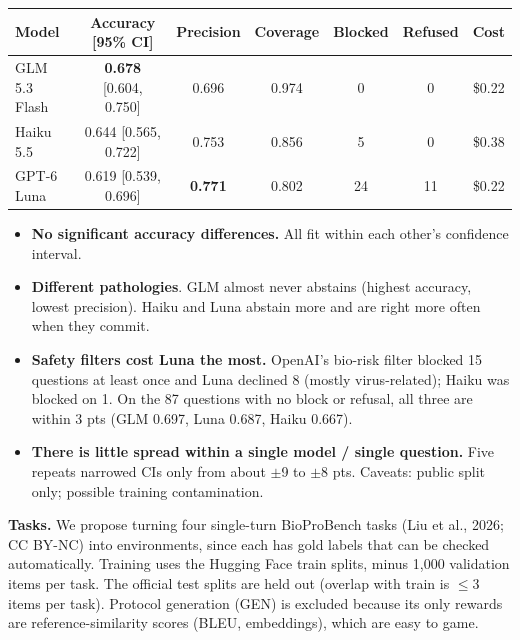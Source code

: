\documentclass[10pt]{article}
\newcommand{\sect}[1]{\par\vspace{5pt}{\bfseries #1}\par\vspace{1pt}}
\begin{document}
\sect{Eval results}
\vspace{-4pt}\begin{center}\small
\begin{tabular}{lcccccc}
\toprule
Model & Accuracy [95\% CI] & Precision & Coverage & Blocked & Refused & Cost \\
\midrule
GLM 5.3 Flash & \textbf{0.678} [0.604, 0.750] & 0.696 & 0.974 & 0 & 0 & \$0.22 \\
Haiku 5.5     & 0.644 [0.565, 0.722] & 0.753 & 0.856 & 5 & 0 & \$0.38 \\
GPT-6 Luna    & 0.619 [0.539, 0.696] & \textbf{0.771} & 0.802 & 24 & 11 & \$0.22 \\
\bottomrule
\end{tabular}
\end{center}\vspace{-6pt}
\begin{itemize}
\item \textbf{No significant accuracy differences.}
All fit within each other's confidence interval.
\item \textbf{Different pathologies}. GLM almost never abstains (highest accuracy,
  lowest precision). Haiku and Luna abstain more and are right more often when they commit.
\item \textbf{Safety filters cost Luna the most.} OpenAI's bio-risk filter blocked 15
  questions at least once and Luna declined 8 (mostly virus-related); Haiku was blocked on
  1. On the 87 questions with no block or refusal, all three are within 3 pts (GLM 0.697,
  Luna 0.687, Haiku 0.667).
\item \textbf{There is little spread within a single model / single question.} Five repeats
  narrowed CIs only from about $\pm$9 to $\pm$8 pts. Caveats: public split only; possible
  training contamination.
\end{itemize}

\sect{RL environments (BioProBench): proposal}
\textbf{Tasks.} We propose turning four single-turn BioProBench tasks (Liu et al., 2026;
CC BY-NC) into environments, since each has gold labels that can be checked automatically.
Training uses the Hugging Face train splits, minus 1,000 validation items per task. The
official test splits are held out (overlap with train is $\le$3 items per task). Protocol
generation (GEN) is excluded because its only rewards are reference-similarity scores (BLEU,
embeddings), which are easy to game.
\end{document}
